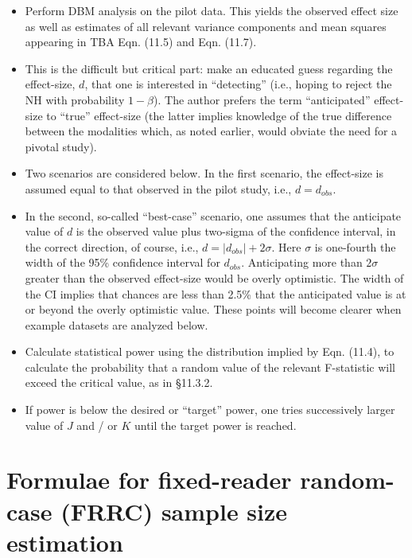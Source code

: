 \documentclass[
]{book}
\providecommand{\tightlist}{%
  \setlength{\itemsep}{0pt}\setlength{\parskip}{0pt}}
\begin{document}
\begin{itemize}
\tightlist
\item
  Perform DBM analysis on the pilot data. This yields the observed effect size as well as estimates of all relevant variance components and mean squares appearing in TBA Eqn. (11.5) and Eqn. (11.7).
\item
  This is the difficult but critical part: make an educated guess regarding the effect-size, \(d\), that one is interested in ``detecting'' (i.e., hoping to reject the NH with probability \(1-\beta\)). The author prefers the term ``anticipated'' effect-size to ``true'' effect-size (the latter implies knowledge of the true difference between the modalities which, as noted earlier, would obviate the need for a pivotal study).
\item
  Two scenarios are considered below. In the first scenario, the effect-size is assumed equal to that observed in the pilot study, i.e., \(d = d_{obs}\).
\item
  In the second, so-called ``best-case'' scenario, one assumes that the anticipate value of \(d\) is the observed value plus two-sigma of the confidence interval, in the correct direction, of course, i.e., \(d=\left | d_{obs} \right |+2\sigma\). Here \(\sigma\) is one-fourth the width of the 95\% confidence interval for \(d_{obs}\). Anticipating more than \(2\sigma\) greater than the observed effect-size would be overly optimistic. The width of the CI implies that chances are less than 2.5\% that the anticipated value is at or beyond the overly optimistic value. These points will become clearer when example datasets are analyzed below.
\item
  Calculate statistical power using the distribution implied by Eqn. (11.4), to calculate the probability that a random value of the relevant F-statistic will exceed the critical value, as in §11.3.2.
\item
  If power is below the desired or ``target'' power, one tries successively larger value of \(J\) and / or \(K\) until the target power is reached.
\end{itemize}

\hypertarget{roc-sample-size-dbm-FRRC-sample-size-estimation}{%
\section{Formulae for fixed-reader random-case (FRRC) sample size estimation}\label{roc-sample-size-dbm-FRRC-sample-size-estimation}}
\end{document}
